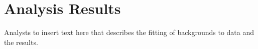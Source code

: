 %

\section{Analysis Results}
\label{results}

{\color{red} Analysts to insert text here that describes the fitting
of backgrounds to data and the results.}
